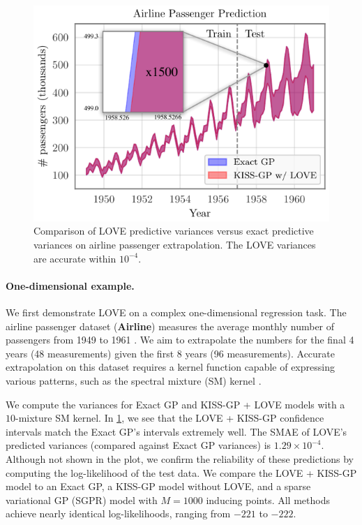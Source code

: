 \begin{figure}[t!]
  \centering
  \includegraphics[width=0.65\columnwidth]{figures/airline_comparison.pdf}
  \caption[Comparison of LOVE predictive variances versus exact predictive variances on airline passenger extrapolation.]{
    Comparison of LOVE predictive variances versus exact predictive variances on airline passenger extrapolation.
    The LOVE{} variances are accurate within $10^{-4}$.
    \label{fig:airline_results}
  }
\end{figure}

\paragraph{One-dimensional example.}
We first demonstrate LOVE{} on a complex one-dimensional regression task.
The airline passenger dataset ({\bf Airline}) measures the average monthly number of passengers from 1949 to 1961 \cite{hyndman2005time}.
We aim to extrapolate the numbers for the final 4 years (48 measurements) given the first 8 years (96 measurements).
Accurate extrapolation on this dataset requires a kernel function capable of expressing various patterns, such as the spectral mixture (SM) kernel \cite{wilson2013gaussian}.

We compute the variances for Exact GP and KISS-GP + LOVE{} models with a $10$-mixture SM kernel.
In \cref{fig:airline_results}, we see that the LOVE + KISS-GP{} confidence intervals match the Exact GP's intervals extremely well.
The SMAE of LOVE{}'s predicted variances (compared against Exact GP variances) is $1.29 \times 10^{-4}$.
Although not shown in the plot, we confirm the reliability of these predictions by computing the log-likelihood of the test data.
We compare the LOVE + KISS-GP{} model to an Exact GP, a KISS-GP model without LOVE{}, and a sparse variational GP (SGPR) model with $M=1000$ inducing points.
All methods achieve nearly identical log-likelihoods, ranging from $-221$ to $-222$.


